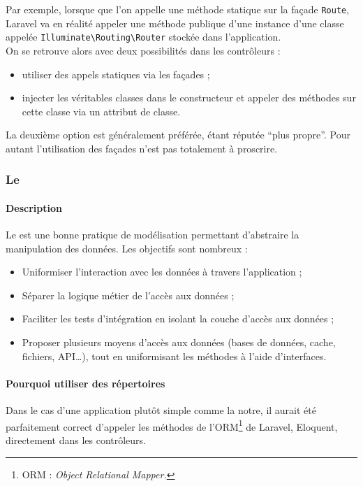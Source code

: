 			Par exemple, lorsque que l'on appelle une méthode statique sur la façade \verb|Route|, Laravel va en réalité appeler une méthode publique d'une instance d'une classe appelée \verb|Illuminate\Routing\Router| stockée dans l'application.\\

			On se retrouve alors avec deux possibilités dans les contrôleurs :
			\begin{itemize}
				\item utiliser des appels statiques via les façades ;
				\item injecter les véritables classes dans le constructeur et appeler des méthodes sur cette classe via un attribut de classe.
			\end{itemize}
			\vspace{10px}
			La deuxième option est généralement préférée, étant réputée \enquote{plus propre}. Pour autant l'utilisation des façades n'est pas totalement à proscrire.

		\subsubsection{Le \repositoryPattern}

			\paragraph{Description}
				Le \repositoryPattern{} est une bonne pratique de modélisation permettant d'abstraire la manipulation des données. Les objectifs sont nombreux :
				\begin{itemize}
					\item Uniformiser l’interaction avec les données à travers l'application ;
					\item Séparer la logique métier de l'accès aux données ;
					\item Faciliter les tests d'intégration en isolant la couche d'accès aux données ;
					\item Proposer plusieurs moyens d'accès aux données (bases de données, cache, fichiers, API\dots), tout en uniformisant les méthodes à l'aide d'interfaces.
				\end{itemize}

			\paragraph{Pourquoi utiliser des répertoires}
				Dans le cas d'une application plutôt simple comme la notre, il aurait été parfaitement correct d'appeler les méthodes de l'ORM\footnote{ORM : \textit{Object Relational Mapper.}} de Laravel, Eloquent, directement dans les contrôleurs.\\

